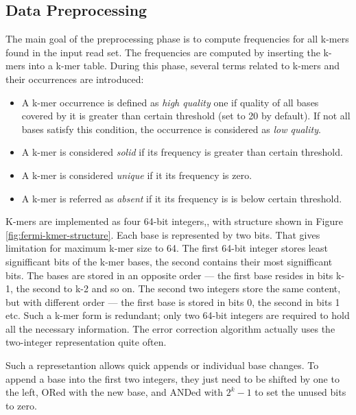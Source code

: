 \subsection{Data Preprocessing}
\label{subsec:fermi-data-preprocessing}

The main goal of the preprocessing phase is to compute frequencies for all k-mers found in the input read set. The frequencies are computed by inserting the k-mers into a k-mer table. During this phase, several terms related to k-mers and their occurrences are introduced:
\begin{itemize}
\item A k-mer occurrence is defined as \textit{high quality} one if quality of all bases covered by it is greater than certain threshold (set to 20 by default). If not all bases satisfy this condition, the occurrence is considered as \textit{low quality}.
\item A k-mer is considered \textit{solid} if its frequency is greater than certain threshold.
\item A k-mer is considered \textit{unique} if it its frequency is zero.
\item A k-mer is referred as \textit{absent} if it its frequency is is below certain threshold.
\end{itemize}
K-mers are implemented as four 64-bit integers,, with structure shown in Figure \ref{fig:fermi-kmer-structure}. Each base is represented by two bits. That gives limitation for maximum k-mer size to 64. The first 64-bit integer stores least signifficant bits of the k-mer bases, the second contains their most signifficant bits. The bases are stored in an opposite order --- the first base resides in bits k-1, the second to k-2 and so on. The second two integers store the same content, but with different order --- the first base is stored in bits 0, the second in bits 1 etc. Such a k-mer form is redundant; only two 64-bit integers are required to hold all the necessary information. The error correction algorithm actually uses the two-integer representation quite often.

Such a represetantion allows quick appends or individual base changes. To append a base into the first two integers, they just need to be shifted by one to the left, ORed with the new base, and ANDed with $2^k-1$ to set the unused bits to zero.

